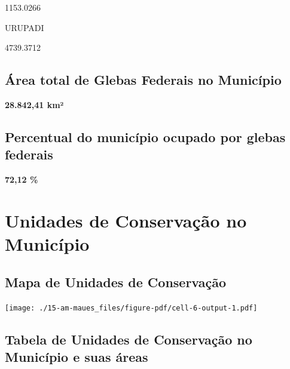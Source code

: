 \documentclass[
  letterpaper,
]{report}
\begin{document}
1153.0266

\n    

\n    

\n      

URUPADI

\n      

4739.3712

\n    

\n  

\n

\hypertarget{uxe1rea-total-de-glebas-federais-no-municuxedpio}{%
\subsection{Área total de Glebas Federais no
Município}\label{uxe1rea-total-de-glebas-federais-no-municuxedpio}}

\textbf{28.842,41 km²}

\hypertarget{percentual-do-municuxedpio-ocupado-por-glebas-federais}{%
\subsection{Percentual do município ocupado por glebas
federais}\label{percentual-do-municuxedpio-ocupado-por-glebas-federais}}

\textbf{72,12 \%}

\hypertarget{unidades-de-conservauxe7uxe3o-no-municuxedpio}{%
\section{Unidades de Conservação no
Município}\label{unidades-de-conservauxe7uxe3o-no-municuxedpio}}

\hypertarget{mapa-de-unidades-de-conservauxe7uxe3o}{%
\subsection{Mapa de Unidades de
Conservação}\label{mapa-de-unidades-de-conservauxe7uxe3o}}

\texttt{[image: ./15-am-maues\_files/figure-pdf/cell-6-output-1.pdf]}

\hypertarget{tabela-de-unidades-de-conservauxe7uxe3o-no-municuxedpio-e-suas-uxe1reas}{%
\subsection{Tabela de Unidades de Conservação no Município e suas
áreas}\label{tabela-de-unidades-de-conservauxe7uxe3o-no-municuxedpio-e-suas-uxe1reas}}
\end{document}
